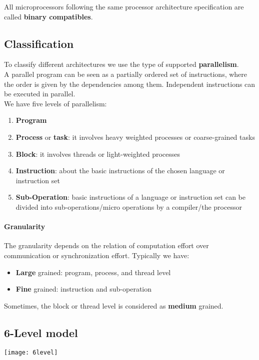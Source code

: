 \begin{definition}
	All microprocessors following the same processor architecture specification are called \textbf{binary compatibles}.
\end{definition}

\subsection{Classification}
To classify different architectures we use the type of supported \textbf{parallelism}.\\
A parallel program can be seen as a partially ordered set of instructions, where the order is given by the dependencies among them. Independent instructions can be executed in parallel.\\
We have five levels of parallelism:
\begin{enumerate}
	\item \textbf{Program}
	\item \textbf{Process} or \textbf{task}: it involves heavy weighted processes or coarse-grained tasks
	\item \textbf{Block}: it involves threads or light-weighted processes
	\item \textbf{Instruction}: about the basic instructions of the chosen language or instruction set
	\item \textbf{Sub-Operation}: basic instructions of a language or instruction set can be divided into sub-operations/micro operations by a compiler/the processor
\end{enumerate}

\paragraph{Granularity}
The granularity depends on the relation of computation effort over communication or synchronization effort. Typically we have:
\begin{itemize}
	\item \textbf{Large} grained: program, process, and thread level 
	\item \textbf{Fine} grained: instruction and sub-operation
\end{itemize}
\begin{note}
	Sometimes, the block or thread level is considered as \textbf{medium} grained.	
\end{note}

\subsection{6-Level model}
\begin{center}
	\texttt{[image: 6level]}
	\label{img:levels}
\end{center}